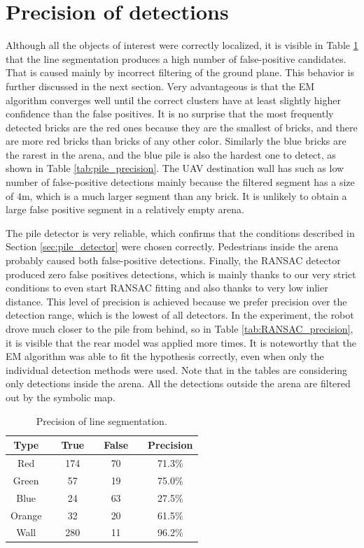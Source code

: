 \section{Precision of detections}
Although all the objects of interest were correctly localized, it is visible in Table \ref{tab:seg_precision} that the line segmentation produces a high number of false-positive candidates. That is caused mainly by incorrect filtering of the ground plane. This behavior is further discussed in the next section. Very advantageous is that the EM algorithm converges well until the correct clusters have at least slightly higher confidence than the false positives. It is no surprise that the most frequently detected bricks are the red ones because they are the smallest of bricks, and there are more red bricks than bricks of any other color. Similarly the blue bricks are the rarest in the arena, and the blue pile is also the hardest one to detect, as shown in Table \ref{tab:pile_precision}. The UAV destination wall has such as low number of false-positive detections mainly because the filtered segment has a size of $4$m, which is a much larger segment than any brick. It is unlikely to obtain a large false positive segment in a relatively empty arena.

The pile detector is very reliable, which confirms that the conditions described in Section \ref{sec:pile_detector} were chosen correctly. Pedestrians inside the arena probably caused both false-positive detections. Finally, the RANSAC detector produced zero false positives detections, which is mainly thanks to our very strict conditions to even start RANSAC fitting and also thanks to very low inlier distance. This level of precision is achieved because we prefer precision over the detection range, which is the lowest of all detectors. In the experiment, the robot drove much closer to the pile from behind, so in Table \ref{tab:RANSAC_precision}, it is visible that the rear model was applied more times. It is noteworthy that the EM algorithm was able to fit the hypothesis correctly, even when only the individual detection methods were used. Note that in the tables are considering only detections inside the arena. All the detections outside the arena are filtered out by the symbolic map.

\begin{table}[H]
	\centering
	\caption{Precision of line segmentation.}
	\begin{tabular}{ccccccc}
		\toprule
		Type &\quad& True &\quad& False &\quad& Precision \\
		\midrule
		Red &\quad& 174 &\quad& 70 &\quad&71.3\% \\
		Green &\quad& 57 &\quad& 19 &\quad& 75.0\% \\
		Blue &\quad& 24 &\quad& 63 &\quad& 27.5\% \\
		Orange &\quad& 32 &\quad& 20 &\quad& 61.5\% \\
		Wall &\quad& 280 &\quad& 11 &\quad& 96.2\% \\
		\bottomrule
	\end{tabular}
	\label{tab:seg_precision}
\end{table}



